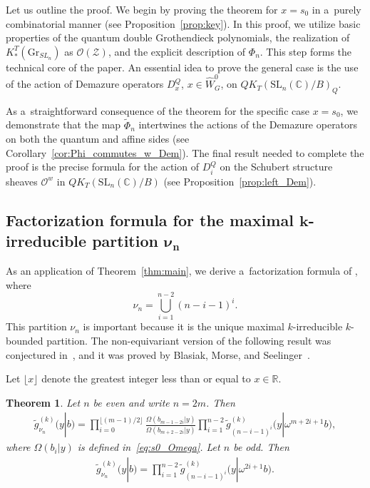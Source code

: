 \documentclass[10pt,a4paper]{amsart}
\numberwithin{equation}{section}
\newcommand{\C}{\mathbb{C}}
\newcommand{\Gr}{\mathrm{Gr}}
\newcommand{\SL}{\mathrm{SL}}
\newtheorem{Theorem}{Theorem}[section]
\theoremstyle{definition}
\begin{document}
Let us outline the proof.
We begin by proving the theorem for $x=s_0$ in a~purely combinatorial manner (see Proposition~\ref{prop:key}).
In this proof, we utilize basic properties of the quantum double Grothendieck polynomials, the realization of $K_*^T(\Gr_{SL_n})$ as $\mathscr{O}(\mathscr{Z})$, and the explicit description of $\Phi_n$.
This step forms the technical core of the paper.
An essential idea to prove the general case is the use of the action of Demazure operators $D_x^Q$, $x\in \hat{W}_G^0$, on $QK_T(\SL_n(\C)/B)_Q$.

As a~straightforward consequence of the theorem for the specific case
$x=s_0$,
we demonstrate that the map $\tilde{\Phi}_n$
intertwines the actions of the Demazure operators on both the quantum and affine sides (see Corollary~\ref{cor:Phi_commutes_w_Dem}).
The final result needed to complete the proof is the
precise formula for the action of
$D_i^Q$ on the Schubert structure sheaves $\mathscr{O}^w$ in
$QK_T(\SL_n(\C)/B)$
(see Proposition~\ref{prop:left_Dem}).

\subsection[Factorization formula for the maximal k-irreducible partition nu\_n]{Factorization formula for the maximal $\boldsymbol{k}$-irreducible partition $\boldsymbol{\nu_n}$}\label{ssec:fac max}
As an application of
Theorem~\ref{thm:main}, we derive a~factorization formula of , where
\[
\nu_n=\bigcup_{i=1}^{n-2}(n-i-1)^i.
\]
This partition $\nu_n$ is important because it is the unique maximal $k$-irreducible $k$-bounded partition.
The non-equivariant version of the following result was conjectured in~\cite{IIM}, and it was proved by Blasiak, Morse, and Seelinger~\cite{BMS}.

Let $\lfloor x\rfloor$ denote the greatest integer less than or equal to $x\in \mathbb{R}$.
\begin{Theorem}\label{thm:max factor}
Let $n$ be even and write $n = 2m$. Then
\begin{align}
\label{eq:even}
\tilde{g}^{(k)}_{\nu_n}(y|b)
= \prod_{i=0}^{\lfloor (m-1)/2 \rfloor}
 \frac{\Omega(b_{m-1-2i} | y)}{\Omega(b_{m+2-2i} | y)}
 \prod_{i=1}^{n-2}
 \tilde{g}^{(k)}_{(n-i-1)^i}\bigl(y | \omega^{m+2i+1} b\bigr),
\end{align}
where
$\Omega(b_i | y)$ is defined in~\eqref{eq:s0_Omega}.
Let $n$ be odd. Then
\begin{align}
\label{eq:odd}
\tilde{g}^{(k)}_{\nu_n}(y|b)
= \prod_{i=1}^{n-2}
 \tilde{g}^{(k)}_{(n-i-1)^i}\bigl(y | \omega^{2i+1} b\bigr).
\end{align}
\end{Theorem}
\end{document}
